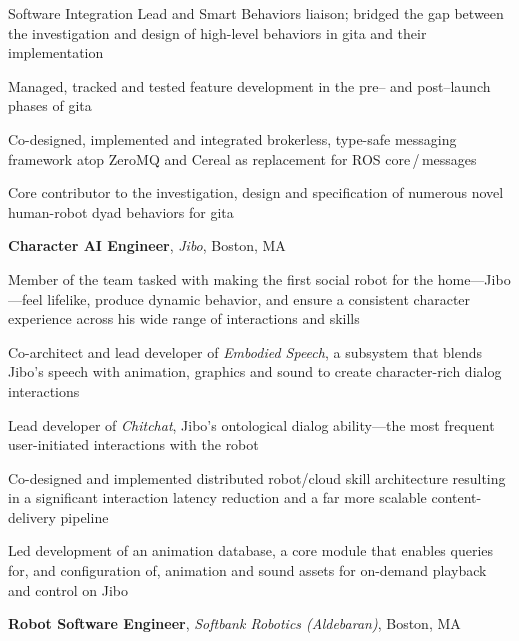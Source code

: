 \documentclass[10pt, letter]{article}
\newcommand{\years}[1]{\marginnote{\footnotesize #1}}
\newenvironment{desc*}{
  \begin{description}
    \setlength{\itemsep}{0.2pt}
    \setlength{\parskip}{-1pt}
    \setlength{\parsep}{0pt}
  }{
  \end{description}
}
\begin{document}
Software Integration Lead and Smart Behaviors liaison; bridged the gap between the investigation and
design of high-level behaviors in gita and their implementation
\begin{itemize}[leftmargin=*, rightmargin=1.5cm]
  {\light
\item Managed, tracked and tested feature development in the pre-- and post--launch phases of gita
\item Co-designed, implemented and integrated brokerless, type-safe messaging framework
  atop ZeroMQ and Cereal as replacement for ROS core\,/\,messages
\item Core contributor to the investigation, design and specification of numerous novel
  human-robot dyad behaviors for gita
  }
\end{itemize}
\bigskip
\years{2016 -- 2018} 
\textbf{Character AI Engineer},
\textit{Jibo}, Boston, MA\bigskip

Member of the team tasked with making the first social robot for the home---Jibo---feel lifelike,
produce dynamic behavior, and ensure a consistent character experience across his wide range of
interactions and skills
\begin{itemize}[leftmargin=*, rightmargin=1.5cm]
  {\light
\item Co-architect and lead developer of \textit{Embodied Speech}, a subsystem that blends Jibo's
  speech with animation, graphics and sound to create character-rich dialog interactions
\item Lead developer of \textit{Chitchat}, Jibo's ontological dialog ability---the most frequent user-initiated
  interactions with the robot
\item Co-designed and implemented distributed robot/cloud skill architecture resulting in a
  significant interaction latency reduction and a far more scalable content-delivery pipeline
\item Led development of an animation database, a core module that enables queries for, and
  configuration of, animation and sound assets for on-demand playback and control on Jibo
  }
\end{itemize}
\newpage
\years{2014 - 2016} 
\textbf{Robot Software Engineer},
\textit{Softbank Robotics (Aldebaran)}, Boston, MA\bigskip
\end{document}
